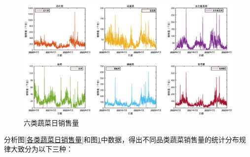 \documentclass{my_paper}
\begin{document}
\begin{figure}[H]
 \centering
 \includegraphics[width=\textwidth]{六类蔬菜日销售量.eps} %
 \caption{六类蔬菜日销售量} %
 \label{六类蔬菜日销售量} %
\end{figure}\par
分析图\ref{各类蔬菜日销售量}和图\ref{六类蔬菜日销售量}中数据，得出不同品类蔬菜销售量的统计分布规律大致分为以下三种：
\end{document}
